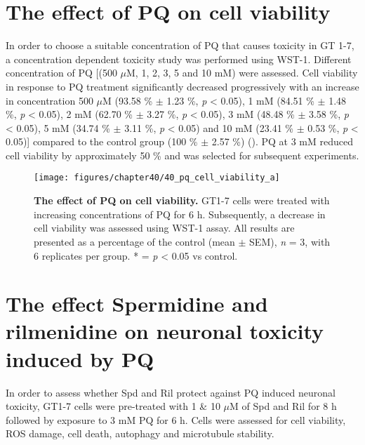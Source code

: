 \section{The effect of PQ on cell viability}
In order to choose a suitable concentration of PQ that causes toxicity in GT 1-7, a concentration dependent toxicity study was performed using WST-1. Different concentration of PQ [(500 $\mu$M, 1, 2, 3, 5 and 10 mM) were assessed. Cell viability in response to PQ treatment significantly decreased progressively with an increase in concentration 500 $\mu$M (93.58 \% $\pm$ 1.23 \%, \textit{p} < 0.05), 1 mM (84.51 \% $\pm$ 1.48 \%, \textit{p} < 0.05), 2 mM (62.70 \% $\pm$ 3.27 \%, \textit{p} < 0.05), 3 mM (48.48 \% $\pm$ 3.58 \%, \textit{p} < 0.05), 5 mM (34.74 \% $\pm$ 3.11 \%, \textit{p} < 0.05) and 10 mM (23.41 \% $\pm$ 0.53 \%, \textit{p} < 0.05)] compared to the control group (100 \% $\pm$ 2.57 \%) (). PQ at 3 mM reduced cell viability by approximately 50 \% and was selected for subsequent experiments.

\begin{figure}[!htbp]
\center
  \texttt{[image: figures/chapter40/40\_pq\_cell\_viability\_a]}
  \caption[The effect of PQ on cell viability]{\textbf{The effect of PQ on cell viability.} GT1-7 cells were treated with increasing concentrations of PQ for 6 h. Subsequently, a decrease in cell viability was assessed using WST-1 assay. All results are presented as a percentage of the control (mean $\pm$ SEM), \textit{n} = 3, with 6 replicates per group. * = \textit{p} < 0.05 vs control.}
  \label{fig:40_pq_cell_viability_a}
\end{figure} 

\section{The effect Spermidine and rilmenidine on neuronal toxicity induced by PQ}
In order to assess whether Spd and Ril protect against PQ induced neuronal toxicity, GT1-7 cells were pre-treated with 1 \& 10 $\mu$M of Spd and Ril for 8 h followed by exposure to 3 mM PQ for 6 h. Cells were assessed for cell viability, ROS damage, cell death, autophagy and microtubule stability.

